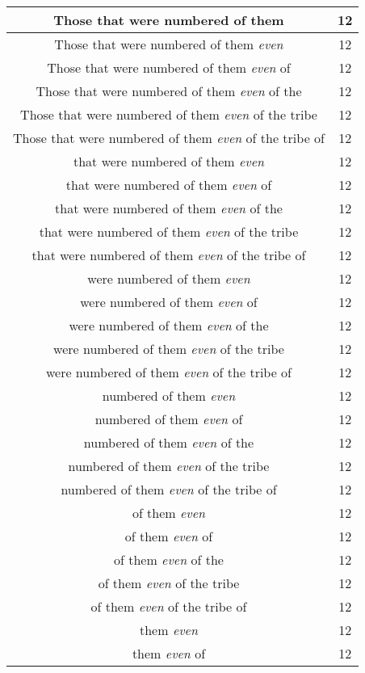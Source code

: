 \begin{center}
\begin{longtable}{|c|c|}
Those that were numbered of them & 12\\ \hline 
Those that were numbered of them \emph{even} & 12\\ \hline 
Those that were numbered of them \emph{even} of & 12\\ \hline 
Those that were numbered of them \emph{even} of the & 12\\ \hline 
Those that were numbered of them \emph{even} of the tribe & 12\\ \hline 
Those that were numbered of them \emph{even} of the tribe of & 12\\ \hline 
that were numbered of them \emph{even} & 12\\ \hline 
that were numbered of them \emph{even} of & 12\\ \hline 
that were numbered of them \emph{even} of the & 12\\ \hline 
that were numbered of them \emph{even} of the tribe & 12\\ \hline 
that were numbered of them \emph{even} of the tribe of & 12\\ \hline 
were numbered of them \emph{even} & 12\\ \hline 
were numbered of them \emph{even} of & 12\\ \hline 
were numbered of them \emph{even} of the & 12\\ \hline 
were numbered of them \emph{even} of the tribe & 12\\ \hline 
were numbered of them \emph{even} of the tribe of & 12\\ \hline 
numbered of them \emph{even} & 12\\ \hline 
numbered of them \emph{even} of & 12\\ \hline 
numbered of them \emph{even} of the & 12\\ \hline 
numbered of them \emph{even} of the tribe & 12\\ \hline 
numbered of them \emph{even} of the tribe of & 12\\ \hline 
of them \emph{even} & 12\\ \hline 
of them \emph{even} of & 12\\ \hline 
of them \emph{even} of the & 12\\ \hline 
of them \emph{even} of the tribe & 12\\ \hline 
of them \emph{even} of the tribe of & 12\\ \hline 
them \emph{even} & 12\\ \hline 
them \emph{even} of & 12\\ \hline 

\end{longtable}
\end{center}
